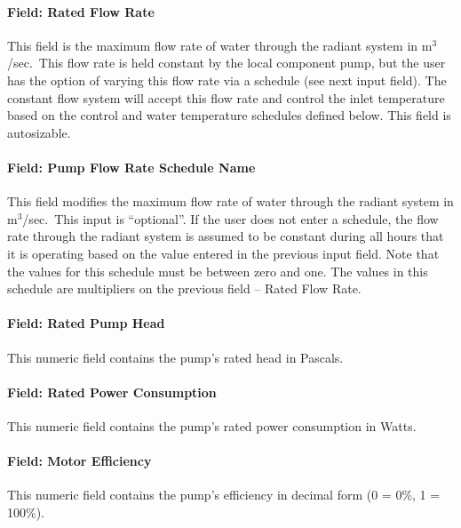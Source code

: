 \paragraph{Field: Rated Flow Rate}\label{field-rated-flow-rate}

This field is the maximum flow rate of water through the radiant system in m\(^{3}\)/sec.~This flow rate is held constant by the local component pump, but the user has the option of varying this flow rate via a schedule (see next input field). The constant flow system will accept this flow rate and control the inlet temperature based on the control and water temperature schedules defined below. This field is autosizable.

\paragraph{Field: Pump Flow Rate Schedule Name}\label{field-pump-flow-rate-schedule-name-001}

This field modifies the maximum flow rate of water through the radiant system in m\(^{3}\)/sec.~This input is ``optional''. If the user does not enter a schedule, the flow rate through the radiant system is assumed to be constant during all hours that it is operating based on the value entered in the previous input field. Note that the values for this schedule must be between zero and one. The values in this schedule are multipliers on the previous field -- Rated Flow Rate.

\paragraph{Field: Rated Pump Head}\label{field-rated-pump-head}

This numeric field contains the pump's rated head in Pascals.

\paragraph{Field: Rated Power Consumption}\label{field-rated-power-consumption-000}

This numeric field contains the pump's rated power consumption in Watts.

\paragraph{Field: Motor Efficiency}\label{field-motor-efficiency-001}

This numeric field contains the pump's efficiency in decimal form (0 = 0\%, 1 = 100\%).


